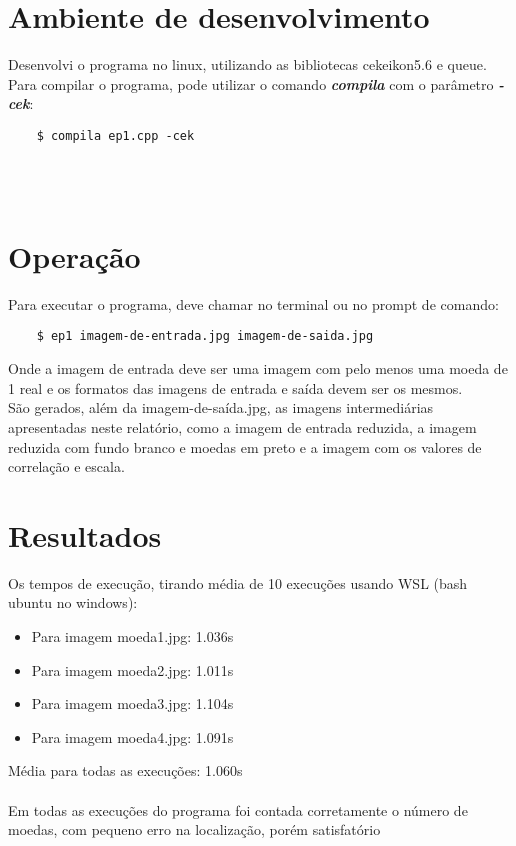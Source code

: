 \documentclass[titlepage,12pt,a4paper]{article}
\begin{document}
    \section{Ambiente de desenvolvimento}
    \label{sec:ambiente}
    Desenvolvi o programa no linux, utilizando as bibliotecas cekeikon5.6 e queue.\\
    Para compilar o programa, pode utilizar o comando \textit{\bfseries compila} com o parâmetro \textit{\bfseries -cek}:
    \begin{lstlisting}
    $ compila ep1.cpp -cek
    \end{lstlisting}
    \\\\
    \section{Operação}
    \label{sec:operação}
    Para executar o programa, deve chamar no terminal ou no prompt de comando:
    \begin{lstlisting}
    $ ep1 imagem-de-entrada.jpg imagem-de-saida.jpg
    \end{lstlisting}
    Onde a imagem de entrada deve ser uma imagem com pelo menos uma moeda de 1 real e os formatos das imagens de entrada e saída devem ser os mesmos.\\
    São gerados, além da imagem-de-saída.jpg, as imagens intermediárias apresentadas neste relatório, como a imagem de entrada reduzida, a imagem reduzida com fundo branco e moedas em preto e a imagem com os valores de correlação e escala.\\
    \section{Resultados}
    \label{sec:resultados}
    Os tempos de execução, tirando média de 10 execuções usando WSL (bash ubuntu no windows):
    \begin{itemize}
        \item Para imagem moeda1.jpg: 1.036s
        \item Para imagem moeda2.jpg: 1.011s
        \item Para imagem moeda3.jpg: 1.104s
        \item Para imagem moeda4.jpg: 1.091s
    \end{itemize}
    Média para todas as execuções: 1.060s\\\\
    Em todas as execuções do programa foi contada corretamente o número de moedas, com pequeno erro na localização, porém satisfatório
\end{document}
